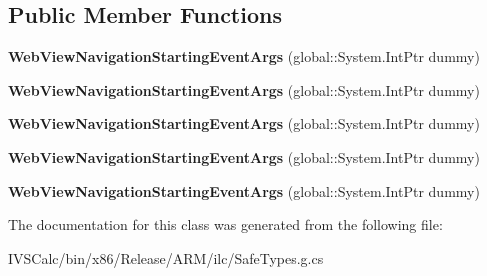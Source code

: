 \subsection*{Public Member Functions}
\begin{DoxyCompactItemize}
\item 
\mbox{\label{class_windows_1_1_u_i_1_1_xaml_1_1_controls_1_1_web_view_navigation_starting_event_args_a3f58fefde4f6892d6b4abce72538f8c1}} 
{\bfseries Web\+View\+Navigation\+Starting\+Event\+Args} (global\+::\+System.\+Int\+Ptr dummy)
\item 
\mbox{\label{class_windows_1_1_u_i_1_1_xaml_1_1_controls_1_1_web_view_navigation_starting_event_args_a3f58fefde4f6892d6b4abce72538f8c1}} 
{\bfseries Web\+View\+Navigation\+Starting\+Event\+Args} (global\+::\+System.\+Int\+Ptr dummy)
\item 
\mbox{\label{class_windows_1_1_u_i_1_1_xaml_1_1_controls_1_1_web_view_navigation_starting_event_args_a3f58fefde4f6892d6b4abce72538f8c1}} 
{\bfseries Web\+View\+Navigation\+Starting\+Event\+Args} (global\+::\+System.\+Int\+Ptr dummy)
\item 
\mbox{\label{class_windows_1_1_u_i_1_1_xaml_1_1_controls_1_1_web_view_navigation_starting_event_args_a3f58fefde4f6892d6b4abce72538f8c1}} 
{\bfseries Web\+View\+Navigation\+Starting\+Event\+Args} (global\+::\+System.\+Int\+Ptr dummy)
\item 
\mbox{\label{class_windows_1_1_u_i_1_1_xaml_1_1_controls_1_1_web_view_navigation_starting_event_args_a3f58fefde4f6892d6b4abce72538f8c1}} 
{\bfseries Web\+View\+Navigation\+Starting\+Event\+Args} (global\+::\+System.\+Int\+Ptr dummy)
\end{DoxyCompactItemize}


The documentation for this class was generated from the following file\+:\begin{DoxyCompactItemize}
\item 
I\+V\+S\+Calc/bin/x86/\+Release/\+A\+R\+M/ilc/Safe\+Types.\+g.\+cs\end{DoxyCompactItemize}
